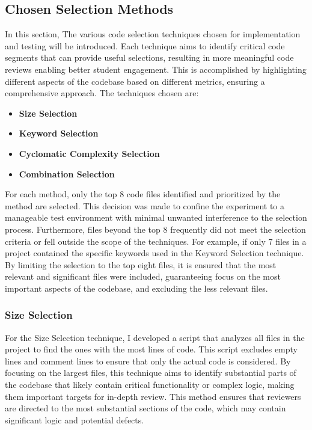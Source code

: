 \subsection{Chosen Selection Methods}
In this section, The various code selection techniques chosen for implementation and testing will be introduced. Each technique aims to identify critical code segments that can provide useful selections, resulting in more meaningful code reviews enabling better student engagement. This is accomplished by highlighting different aspects of the codebase based on different metrics, ensuring a comprehensive approach. The techniques chosen are:
\begin{itemize}
    \item \textbf{Size Selection}
    \item \textbf{Keyword Selection}
    \item \textbf{Cyclomatic Complexity Selection}
    \item \textbf{Combination Selection}
\end{itemize}

For each method, only the top 8 code files identified and prioritized by the method are selected. This decision was made to confine the experiment to a manageable test environment with minimal unwanted interference to the selection process. Furthermore, files beyond the top 8 frequently did not meet the selection criteria or fell outside the scope of the techniques. For example, if only 7 files in a project contained the specific keywords used in the Keyword Selection technique. By limiting the selection to the top eight files, it is ensured that the most relevant and significant files were included, guaranteeing focus on the most important aspects of the codebase, and excluding the less relevant files.


\subsubsection{Size Selection}
For the Size Selection technique, I developed a script that analyzes all files in the project to find the ones with the most lines of code. This script excludes empty lines and comment lines to ensure that only the actual code is considered. By focusing on the largest files, this technique aims to identify substantial parts of the codebase that likely contain critical functionality or complex logic, making them important targets for in-depth review. This method ensures that reviewers are directed to the most substantial sections of the code, which may contain significant logic and potential defects.

